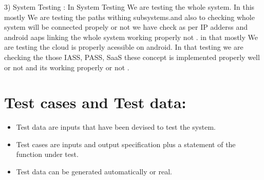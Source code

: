                3) System Testing :
                             In System Testing We are testing the whole system. In this mostly We are testing the 
                   paths withing subsystems.and also to checking whole system will be connected propely or not 
                   we have check as per IP adderss and android aaps linking the whole system working properly not .
                   in that mostly We are testing  the cloud is properly acessible on android. 
                             In that testing we are checking the those IASS, PASS, SaaS these concept is implemented 
                     properly well or not and its working properly or not .
  

\section{Test cases and Test data: }
\begin{itemize}
\item Test data are inputs that have been devised to test the system.
\item Test cases are inputs and output specification plus a statement of the function under test.
\item Test data can be generated automatically or real. 
\end{itemize}
